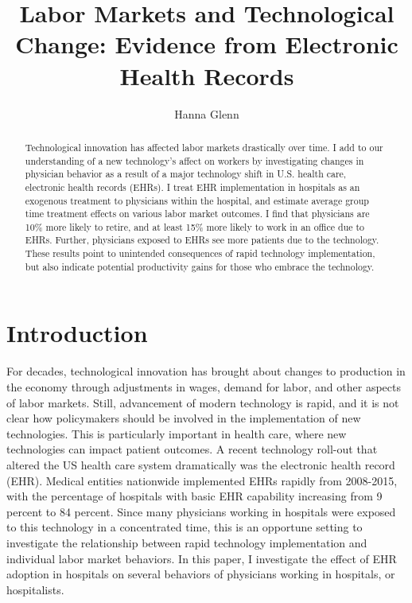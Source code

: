 \documentclass[12pt]{article}
\title{Labor Markets and Technological Change: Evidence from Electronic Health Records}
\author{Hanna Glenn}
\begin{document}
\maketitle

\begin{abstract}
    Technological innovation has affected labor markets drastically over time. I add to our understanding of a new technology's affect on workers by investigating changes in physician behavior as a result of a major technology shift in U.S. health care, electronic health records (EHRs). I treat EHR implementation in hospitals as an exogenous treatment to physicians within the hospital, and estimate average group time treatment effects on various labor market outcomes. I find that physicians are 10\% more likely to retire, and at least 15\% more likely to work in an office due to EHRs. Further, physicians exposed to EHRs see more patients due to the technology. These results point to unintended consequences of rapid technology implementation, but also indicate potential productivity gains for those who embrace the technology.
\end{abstract}

\vspace{1.5cm}

\section{Introduction}
For decades, technological innovation has brought about changes to production in the economy through adjustments in wages, demand for labor, and other aspects of labor markets. Still, advancement of modern technology is rapid, and it is not clear how policymakers should be involved in the implementation of new technologies. This is particularly important in health care, where new technologies can impact patient outcomes. A recent technology roll-out that altered the US health care system dramatically was the electronic health record (EHR). Medical entities nationwide implemented EHRs rapidly from 2008-2015, with the percentage of hospitals with basic EHR capability increasing from 9 percent to 84 percent. Since many physicians working in hospitals were exposed to this technology in a concentrated time, this is an opportune setting to investigate the relationship between rapid technology implementation and individual labor market behaviors. In this paper, I investigate the effect of EHR adoption in hospitals on several behaviors of physicians working in hospitals, or hospitalists. 
\end{document}
